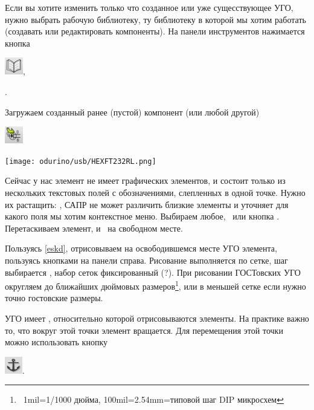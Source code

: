 \bigskip
Если вы хотите изменить только что созданное или уже сущесствующее УГО, нужно
выбрать рабочую библиотеку, ту библиотеку в которой мы хотим работать (создавать
или редактировать компоненты). На панели инструментов нажимается кнопка

\includegraphics[height=2em]{kicad/lib24.png},

.

Загружаем созданный ранее (пустой) компонент  (или любой
другой)

\includegraphics[height=2em]{kicad/editel.png}


\bigskip
\texttt{[image: odurino/usb/HEXFT232RL.png]}

Сейчас у нас элемент не имеет графических элементов, и состоит только из
нескольких текстовых полей с обозначениями, слепленных в одной точке. Нужно их
растащить: \rms, САПР не может различить близкие элементы и уточняет для
какого поля мы хотим контекстное меню. Выбираем любое, \
или кнопка . Перетаскиваем элемент, и \lms\ на свободном месте.

Пользуясь \ref{eskd}, отрисовываем на освободившемся месте УГО элемента,
пользуясь кнопками на панели справа. Рисование выполняется по сетке, шаг
выбирается \menu{\rms>Выбор сетки}, набор сеток фиксированный (?). При рисовании
ГОСТовских УГО округляем до ближайших дюймовых размеров\footnote{\ 1mil=1/1000
дюйма, 100mil=2.54mm=типовой шаг DIP микросхем}, или в меньшей сетке если нужно
точно гостовские размеры.

УГО имеет , относительно которой отрисовываются элементы.
На практике важно то, что вокруг этой точки элемент вращается. Для перемещения
этой точки можно использовать кнопку

\includegraphics[height=2em]{kicad/lib27.png}.

